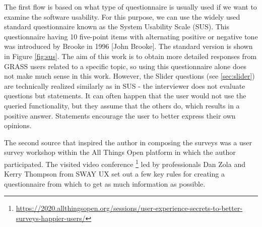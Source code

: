 \documentclass[a4paper,10pt,twoside]{article}
\begin{document}
The first flow is based on what type of questionnaire is usually used if we want to examine the software usability. For this purpose, we can use the widely used standard questionnaire known as the System Usability Scale (SUS). This questionnaire having 10 five-point items with alternating positive or negative tone was introduced by Brooke in 1996 [John Brooke]. The standard version is shown in Figure \ref{fig:sus}. The aim of this work is to obtain more detailed responses from GRASS users related to a specific topic, so using this questionnaire alone does not make much sense in this work. However, the Slider questions (see \ref{sec:slider}) are technically realized similarly as in SUS - the interviewer does not evaluate questions but statements. It can often happen that the user would not use the queried functionality, but they assume that the others do, which results in a positive answer. Statements encourage the user to better express their own opinions.

The second source that inspired the author in composing the surveys was a user survey workshop within the All Things Open platform in which the author participated. The visited video conference \footnote{\url{https://2020.allthingsopen.org/sessions/user-experience-secrets-to-better-surveys-happier-users/}} led by professionals Dan Zola and Kerry Thompson from SWAY UX set out a few key rules for creating a questionnaire from which to get as much information as possible.
\end{document}
